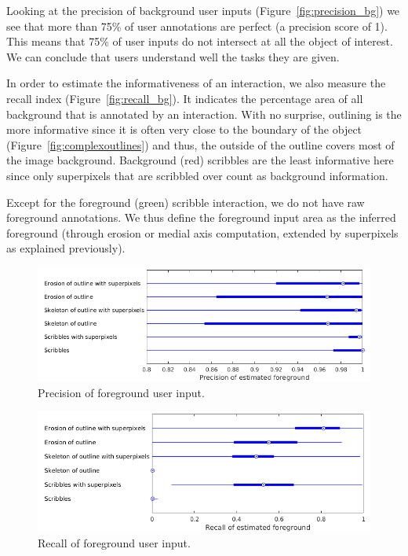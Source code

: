 Looking at the precision of background user inputs
(Figure~\ref{fig:precision_bg}) we see that more than
75\% of user annotations are perfect (a precision score of 1).
This means that 75\% of user inputs do not intersect at all
the object of interest.
We can conclude that users understand well the tasks they are given.


In order to estimate the informativeness of an interaction,
we also measure the recall index (Figure~\ref{fig:recall_bg}).
It indicates the percentage area of all background
that is annotated by an interaction.
With no surprise, outlining is the more informative
since it is often very close to the boundary of the object
(Figure~\ref{fig:complexoutlines}) and thus,
the outside of the outline covers most of the image background.
Background (red) scribbles are the least informative here since only
superpixels that are scribbled over count as background information.


Except for the foreground (green) scribble interaction,
we do not have raw foreground annotations.
We thus define the foreground input area as the inferred foreground
(through erosion or medial axis computation,
extended by superpixels as explained previously).


\begin{figure}[ht]
\includegraphics[width=\columnwidth]{assets/plot/precision_fg_all.png}
\caption{Precision of foreground user input.}%
\label{fig:precision_fg}
\end{figure}


\begin{figure}[ht]
\includegraphics[width=\columnwidth]{assets/plot/recall_fg_all.png}
\caption{Recall of foreground user input.}%
\label{fig:recall_fg}
\end{figure}


